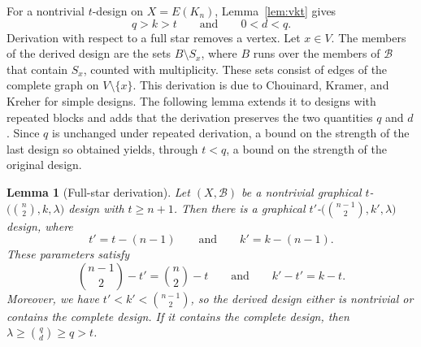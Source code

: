 \documentclass[12pt]{amsart}
\newtheorem{lemma}[theorem]{Lemma}
\theoremstyle{definition}
\newcommand{\cB}{\mathcal{B}}
\begin{document}
For a nontrivial $t$-design on $X = E(K_n)$, Lemma~\ref{lem:vkt} gives
\begin{equation}
\label{eq:qkt}
q > k > t \qquad \text{and} \qquad 0 < d < q.
\end{equation}
Derivation with respect to a full star removes a vertex. Let $x \in V$. The
members of the derived design are the sets $B \setminus S_x$, where $B$ runs
over the members of $\cB$ that contain $S_x$, counted with multiplicity.
These sets consist of edges of the complete graph on $V \setminus \{x\}$.
This derivation is due to Chouinard, Kramer, and Kreher \cite[Theorem
2.9]{CKK1983} for simple designs. The following lemma extends it to designs
with repeated blocks and adds that the derivation preserves the two
quantities $q$ and $d$. Since $q$ is unchanged under repeated derivation, a
bound on the strength of the last design so obtained yields, through $t <
q$, a bound on the strength of the original design.

\begin{lemma}[Full-star derivation]
\label{lem:derivation}
Let $(X, \cB)$ be a nontrivial graphical $t$-$\bigl(\binom{n}{2}, k,
\lambda\bigr)$ design with $t \geq n + 1$. Then there is a graphical
$t'$-$\bigl(\binom{n-1}{2}, k', \lambda\bigr)$ design, where
\[
t' = t - (n - 1)
\qquad \text{and} \qquad
k' = k - (n - 1).
\]
These parameters satisfy
\begin{equation}
\label{eq:invariants}
\binom{n - 1}{2} - t' = \binom{n}{2} - t
\qquad \text{and} \qquad
k' - t' = k - t.
\end{equation}
Moreover, we have $t' < k' < \binom{n - 1}{2}$, so the derived design either
is nontrivial or contains the complete design. If it contains the complete
design, then $\lambda \geq \binom{q}{d} \geq q > t$.
\end{lemma}
\end{document}
